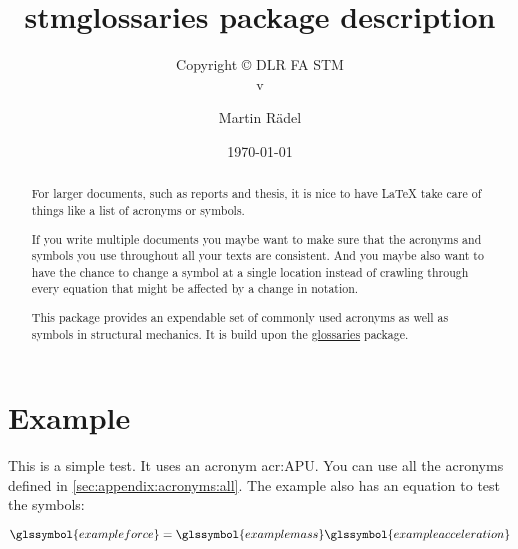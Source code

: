 \documentclass[%
  type=article,%
  layout=koma,%
  hyperref=true,%
  conditionallox=true,%
  conditionalloxnewpage=false,%
  date=true,%
  index=true,%
  listings=true%
]{stmtext}
\author{Martin R\"{a}del}
\title{stmglossaries package description}
\subtitle{Copyright \copyright{} \the\year{} DLR FA STM\\v\formatdate[versiondatestyle]{\DTMToday}}
\date{\today}
\begin{document}
\maketitle

\begin{abstract}
For larger documents, such as reports and thesis, it is nice to have \LaTeX{} take care of things like a list of acronyms or symbols.

If you write multiple documents you maybe want to make sure that the acronyms and symbols you use throughout all your texts are consistent. And you maybe also want to have the chance to change a symbol at a single location instead of crawling through every equation that might be affected by a change in notation.

This package provides an expendable set of commonly used acronyms as well as symbols in structural mechanics. It is build upon the \href{https://ctan.org/pkg/glossaries?lang=en}{glossaries} package.
\end{abstract}

\tableofcontents

\conditionallistoffigures  %
\conditionallistoftables   %
\conditionallistoflistings %

\section{Example}

This is a simple test. It uses an acronym \gls{acr:APU}. You can use all the acronyms defined in \autoref{sec:appendix:acronyms:all}. The example also has an equation to test the symbols:


\begin{equation}  
\glssymbol{exampleforce} = \glssymbol{examplemass}\glssymbol{exampleacceleration}
\end{equation}

% 
% 
\end{document}
